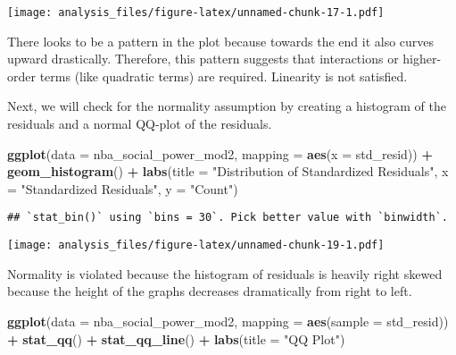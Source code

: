 \documentclass[]{article}
\newenvironment{Shaded}{\begin{snugshade}}{\end{snugshade}}
\newcommand{\DataTypeTok}[1]{\textcolor[rgb]{0.13,0.29,0.53}{#1}}
\newcommand{\KeywordTok}[1]{\textcolor[rgb]{0.13,0.29,0.53}{\textbf{#1}}}
\newcommand{\NormalTok}[1]{#1}
\newcommand{\OperatorTok}[1]{\textcolor[rgb]{0.81,0.36,0.00}{\textbf{#1}}}
\newcommand{\StringTok}[1]{\textcolor[rgb]{0.31,0.60,0.02}{#1}}
\begin{document}
\texttt{[image: analysis\_files/figure-latex/unnamed-chunk-17-1.pdf]}

There looks to be a pattern in the plot because towards the end it also
curves upward drastically. Therefore, this pattern suggests that
interactions or higher-order terms (like quadratic terms) are required.
Linearity is not satisfied.

Next, we will check for the normality assumption by creating a histogram
of the residuals and a normal QQ-plot of the residuals.

\begin{Shaded}
\end{Shaded}

\begin{Shaded}
\begin{Highlighting}[]
\KeywordTok{ggplot}\NormalTok{(}\DataTypeTok{data =}\NormalTok{ nba_social_power_mod2, }\DataTypeTok{mapping =} \KeywordTok{aes}\NormalTok{(}\DataTypeTok{x =}\NormalTok{ std_resid)) }\OperatorTok{+}\StringTok{ }\KeywordTok{geom_histogram}\NormalTok{() }\OperatorTok{+}\StringTok{ }\KeywordTok{labs}\NormalTok{(}\DataTypeTok{title =} \StringTok{"Distribution of Standardized Residuals"}\NormalTok{, }\DataTypeTok{x =} \StringTok{"Standardized Residuals"}\NormalTok{, }\DataTypeTok{y =} \StringTok{"Count"}\NormalTok{)}
\end{Highlighting}
\end{Shaded}

\begin{verbatim}
## `stat_bin()` using `bins = 30`. Pick better value with `binwidth`.
\end{verbatim}

\texttt{[image: analysis\_files/figure-latex/unnamed-chunk-19-1.pdf]}

Normality is violated because the histogram of residuals is heavily
right skewed because the height of the graphs decreases dramatically
from right to left.

\begin{Shaded}
\begin{Highlighting}[]
\KeywordTok{ggplot}\NormalTok{(}\DataTypeTok{data =}\NormalTok{ nba_social_power_mod2, }\DataTypeTok{mapping =} \KeywordTok{aes}\NormalTok{(}\DataTypeTok{sample =}\NormalTok{ std_resid)) }\OperatorTok{+}\StringTok{ }\KeywordTok{stat_qq}\NormalTok{() }\OperatorTok{+}\StringTok{ }\KeywordTok{stat_qq_line}\NormalTok{() }\OperatorTok{+}\StringTok{ }\KeywordTok{labs}\NormalTok{(}\DataTypeTok{title =} \StringTok{"QQ Plot"}\NormalTok{)}
\end{Highlighting}
\end{Shaded}
\end{document}
